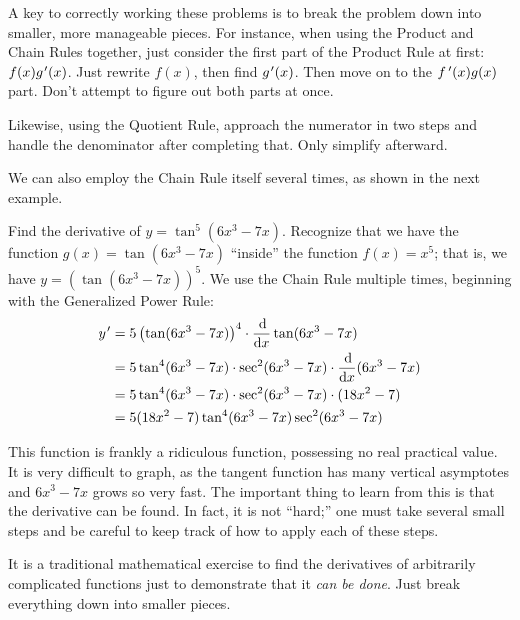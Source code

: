 A key to correctly working these problems is to break the problem down into smaller, more manageable pieces. For instance, when using the Product and Chain Rules together, just consider the first part of the Product Rule at first: $f(x)g\primeskip'(x)$. Just rewrite $f(x)$, then find $g\primeskip'(x)$. Then move on to the $f\,'(x)g(x)$ part. Don't attempt to figure out both parts at once.

Likewise, using the Quotient Rule, approach the numerator in two steps and handle the denominator after completing that. Only simplify afterward.

We can also employ the Chain Rule itself several times, as shown in the next example.

\begin{example}\label{ex_chain6}%
Find the derivative of $y = \tan^5(6x^3-7x)$.
\solution
Recognize that we have the function $g(x)=\tan(6x^3-7x)$ ``inside'' the function $f(x) = x^5$; that is, we have $y=\left(\tan(6x^3-7x)\right)^5$. We use the Chain Rule multiple times, beginning with the Generalized Power Rule:
\begin{align*}
y\primeskip' &= 5\left(\tan(6x^3-7x)\right)^4 \cdot \frac{\dd}{\dd x} \tan(6x^3-7x)\\
&= 5\tan^4(6x^3-7x) \cdot \sec^2 (6x^3-7x) \cdot \frac{\dd}{\dd x}(6x^3-7x) \\
&= 5\tan^4 (6x^3-7x) \cdot \sec^2 (6x^3-7x) \cdot (18x^2-7)\\
&= 5(18x^2-7)\tan^4 (6x^3-7x) \sec^2 (6x^3-7x) \\
\end{align*}

This function is frankly a ridiculous function, possessing no real practical value. It is very difficult to graph, as the tangent function has many vertical asymptotes and $6x^3-7x$ grows so very fast. The important thing to learn from this is that the derivative can be found. In fact, it is not ``hard;'' one must take several small steps and be careful to keep track of how to apply each of these steps.%
\end{example}

It is a traditional mathematical exercise to find the derivatives of arbitrarily complicated functions just to demonstrate that it \emph{can be done}. Just break everything down into smaller pieces.

